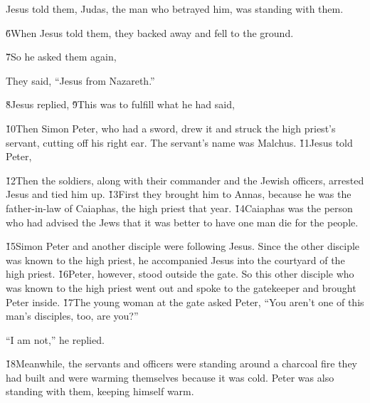 Jesus told them,  Judas, the man who betrayed him, was standing with them.

\v{6}When Jesus told them,  they backed away and fell to the ground.

\v{7}So he asked them again, 

They said, ``Jesus from Nazareth.''

\v{8}Jesus replied,  \v{9}This was to fulfill what he had said, 

\v{10}Then Simon Peter, who had a sword, drew it and struck the high priest's servant, cutting off his right ear. The servant's name was Malchus. \v{11}Jesus told Peter, 

\v{12}Then the soldiers, along with their commander and the Jewish officers, arrested Jesus and tied him up. \v{13}First they brought him to Annas, because he was the father-in-law of Caiaphas, the high priest that year. \v{14}Caiaphas was the person who had advised the Jews that it was better to have one man die for the people.

\v{15}Simon Peter and another disciple were following Jesus. Since the other disciple was known to the high priest, he accompanied Jesus into the courtyard of the high priest. \v{16}Peter, however, stood outside the gate. So this other disciple who was known to the high priest went out and spoke to the gatekeeper and brought Peter inside. \v{17}The young woman at the gate asked Peter, ``You aren't one of this man's disciples, too, are you?''

``I am not,'' he replied.

\v{18}Meanwhile, the servants and officers were standing around a charcoal fire they had built and were warming themselves because it was cold. Peter was also standing with them, keeping himself warm.

